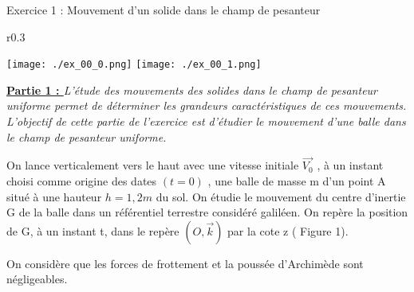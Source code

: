 \documentclass[12pt, french]{article}
\begin{document}
\begin{center}

\end{center}

\vspace{-0.2cm}
   \begin{Box2}{Exercice 1 : Mouvement d’un solide dans le champ de pesanteur }


	   \begin{wrapfigure}[12]{r}{0.3\textwidth}   
  \begin{center}
	  \vspace{-0.6cm}
	\texttt{[image: ./ex\_00\_0.png]}
	\texttt{[image: ./ex\_00\_1.png]}
  \end{center}
\end{wrapfigure}

	   \textbf{\underline{Partie 1 : }}
	   \emph{L’étude des mouvements des solides dans le champ de pesanteur uniforme permet de déterminer les
grandeurs caractéristiques de ces mouvements.
L’objectif de cette partie de l’exercice est d’étudier le mouvement d’une balle dans le champ de
pesanteur uniforme.}

On lance verticalement vers le haut avec une vitesse initiale $\vec{V_0}$ , à un 
 instant choisi comme origine des dates $(t=0)$ , une balle de masse m d’un
point A situé à une hauteur $h = 1,2 m$ du sol.
On étudie le mouvement du centre d’inertie G de la balle dans un
référentiel terrestre considéré galiléen. On repère la position de G,
à un instant t, dans le repère $(O , \vec{k})$ par la cote z ( Figure 1).

On considère que les forces de frottement et la poussée d’Archimède sont
négligeables.


\end{Box2}
\end{document}
